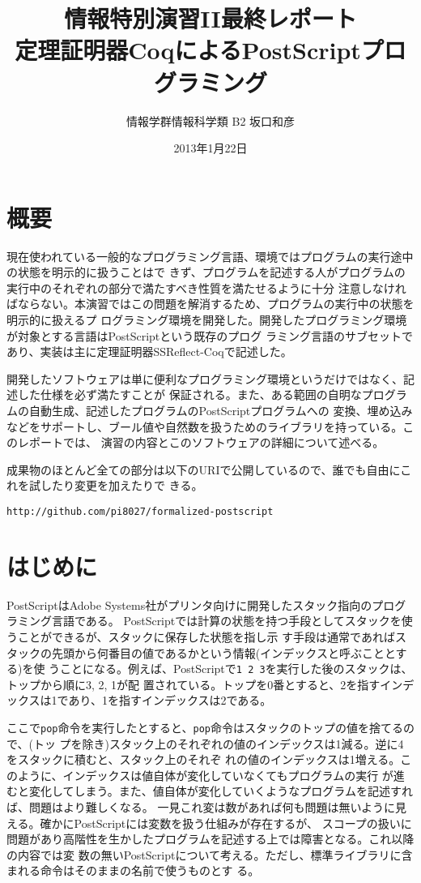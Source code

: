 \documentclass[a4paper, 10pt, twocolumn, titlepage]{ujarticle}
\title{情報特別演習II最終レポート\\定理証明器CoqによるPostScriptプログラミング}
\author{情報学群情報科学類 B2 坂口和彦}
\date{2013年1月22日}
\renewcommand{\{}{\symbol{"7B}}
\renewcommand{\}}{\symbol{"7D}}
\begin{document}
\clearpage

\maketitle

\section{概要}

現在使われている一般的なプログラミング言語、環境ではプログラムの実行途中の状態を明示的に扱うことはで
きず、プログラムを記述する人がプログラムの実行中のそれぞれの部分で満たすべき性質を満たせるように十分
注意しなければならない。本演習ではこの問題を解消するため、プログラムの実行中の状態を明示的に扱えるプ
ログラミング環境を開発した。開発したプログラミング環境が対象とする言語はPostScriptという既存のプログ
ラミング言語のサブセットであり、実装は主に定理証明器SSReflect-Coqで記述した。

開発したソフトウェアは単に便利なプログラミング環境というだけではなく、記述した仕様を必ず満たすことが
保証される。また、ある範囲の自明なプログラムの自動生成、記述したプログラムのPostScriptプログラムへの
変換、埋め込みなどをサポートし、ブール値や自然数を扱うためのライブラリを持っている。このレポートでは、
演習の内容とこのソフトウェアの詳細について述べる。

成果物のほとんど全ての部分は以下のURIで公開しているので、誰でも自由にこれを試したり変更を加えたりで
きる。

{\small\texttt{http://github.com/pi8027/formalized-postscript}}

\section{はじめに}

PostScriptはAdobe Systems社がプリンタ向けに開発したスタック指向のプログラミング言語である。
PostScriptでは計算の状態を持つ手段としてスタックを使うことができるが、スタックに保存した状態を指し示
す手段は通常であればスタックの先頭から何番目の値であるかという情報(インデックスと呼ぶこととする)を使
うことになる。例えば、PostScriptで\texttt{1 2 3}を実行した後のスタックは、トップから順に3, 2, 1が配
置されている。トップを0番とすると、2を指すインデックスは1であり、1を指すインデックスは2である。

ここで\texttt{pop}命令を実行したとすると、\texttt{pop}命令はスタックのトップの値を捨てるので、(トッ
プを除き)スタック上のそれぞれの値のインデックスは1減る。逆に4をスタックに積むと、スタック上のそれぞ
れの値のインデックスは1増える。このように、インデックスは値自体が変化していなくてもプログラムの実行
が進むと変化してしまう。また、値自体が変化していくようなプログラムを記述すれば、問題はより難しくなる。
一見これ変は数があれば何も問題は無いように見える。確かにPostScriptには変数を扱う仕組みが存在するが、
スコープの扱いに問題があり高階性を生かしたプログラムを記述する上では障害となる。これ以降の内容では変
数の無いPostScriptについて考える。ただし、標準ライブラリに含まれる命令はそのままの名前で使うものとす
る。
\end{document}
